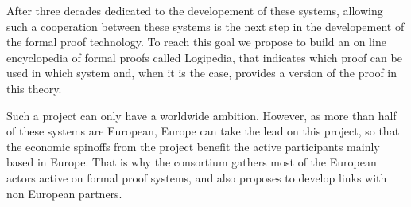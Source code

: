 After three decades dedicated to the developement of these systems,
allowing such a cooperation between these systems is the next step in
the developement of the formal proof technology.  To reach this goal
we propose to build an on line encyclopedia of formal proofs called
{\sc Logipedia}, that indicates which proof can be used in which
system and, when it is the case, provides a version of the proof in
this theory.

Such a project can only have a worldwide ambition. However, as more
than half of these systems are European, Europe can take the lead on
this project, so that the economic spinoffs from the project benefit
the active participants mainly based in Europe.  That is why the
consortium gathers most of the European actors active on formal proof
systems, and also proposes to develop links with non European
partners.
